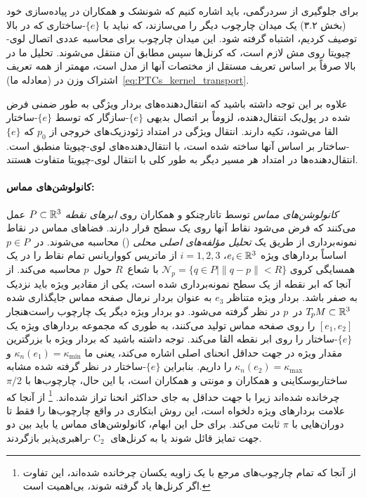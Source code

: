 برای جلوگیری از سردرگمی، باید اشاره کنیم که شونشک و همکاران\cite{schonsheck2018parallel} در پیاده‌سازی خود (بخش ۳.۲) یک میدان چارچوب دیگر را می‌سازند، که نباید با $\{e\}$-ساختاری که در بالا توصیف کردیم، اشتباه گرفته شود.
این میدان چارچوب برای محاسبه عددی اتصال لوی-چیویتا روی مش لازم است، که کرنل‌ها سپس مطابق آن منتقل می‌شوند.
تحلیل ما در بالا صرفاً بر اساس تعریف مستقل از مختصات آنها از مدل است، مهمتر از همه تعریف اشتراک وزن در (معادله ما)~\eqref{eq:PTCs_kernel_transport}.

علاوه بر این توجه داشته باشید که انتقال‌دهنده‌های بردار ویژگی به طور ضمنی فرض شده در پول‌بک انتقال‌دهنده، لزوماً بر اتصال بدیهی $\{e\}$-سازگار که توسط $\{e\}$-ساختار القا می‌شود، تکیه دارند.
انتقال ویژگی در امتداد ژئودزیک‌های خروجی از $p_0$ که $\{e\}$-ساختار بر اساس آنها ساخته شده است، با انتقال‌دهنده‌های لوی-چیویتا منطبق است.
انتقال‌دهنده‌ها در امتداد هر مسیر دیگر به طور کلی با انتقال لوی-چیویتا متفاوت هستند.





\paragraph{کانولوشن‌های مماس:}
\emph{کانولوشن‌های مماس} توسط تاتارچنکو و همکاران\cite{tatarchenko2018tangent} روی \emph{ابرهای نقطه} ${P\subset \mathbb{R}^3}$ عمل می‌کنند که فرض می‌شود نقاط آنها روی یک سطح قرار دارند.
فضاهای مماس در نقاط نمونه‌برداری از طریق یک \emph{تحلیل مؤلفه‌های اصلی محلی} () محاسبه می‌شوند.
 در~$p\in P$ اساساً بردارهای ویژه ${e_i \!\in \mathbb{R}^3}$، ${i=\!1,2,3}$ از ماتریس کوواریانس تمام نقاط را در یک همسایگی کروی ${\mathcal{N}_p =} {\{q\in P | \lVert q-p\rVert<R \}}$ با شعاع~$R$ حول~$p$ محاسبه می‌کند.
از آنجا که ابر نقطه از یک سطح نمونه‌برداری شده است، یکی از مقادیر ویژه باید نزدیک به صفر باشد.
بردار ویژه متناظر $e_3$ به عنوان بردار نرمال صفحه مماس جایگذاری شده $T_{\mkern-1.5mu p}\mkern-.5muM \subset \mathbb{R}^3$ در~$p$ در نظر گرفته می‌شود.
دو بردار ویژه دیگر یک چارچوب راست‌هنجار $[e_1,e_2]$ را روی صفحه مماس تولید می‌کنند، به طوری که مجموعه بردارهای ویژه  یک $\{e\}$-ساختار را روی ابر نقطه القا می‌کند.
توجه داشته باشید که بردار ویژه با بزرگترین مقدار ویژه در جهت حداقل انحنای اصلی اشاره می‌کند، یعنی ما $\kappa_n(e_1) = \kappa_{\min}$ و $\kappa_n(e_2) = \kappa_{\max}$ را داریم.
بنابراین $\{e\}$-ساختار در نظر گرفته شده مشابه ساختاربوسکاینی و همکاران \cite{boscaini2015learning} و مونتی و همکاران\cite{monti2017geometric} است، با این حال، چارچوب‌ها با $\pi/2$ چرخانده شده‌اند زیرا با جهت حداقل به جای حداکثر انحنا تراز شده‌اند.%
\footnote{
    از آنجا که تمام چارچوب‌های مرجع با یک زاویه یکسان چرخانده شده‌اند، این تفاوت اگر کرنل‌ها یاد گرفته شوند، بی‌اهمیت است.
}
از آنجا که علامت بردارهای ویژه دلخواه است، این روش ابتکاری در واقع چارچوب‌ها را فقط تا دوران‌هایی با $\pi$ ثابت می‌کند.
برای حل این ابهام، کانولوشن‌های مماس یا باید بین دو جهت تمایز قائل شوند یا به کرنل‌های $\operatorname{C}_2$-راهبری‌پذیر بازگردند.

